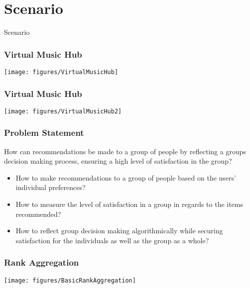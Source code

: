 \section{Scenario}

\begin{frame}
	\begin{center}
		\huge Scenario
	\end{center}
\end{frame}

\begin{frame}
	\frametitle{Virtual Music Hub}
	\texttt{[image: figures/VirtualMusicHub]}
\end{frame}

\begin{frame}
	\frametitle{Virtual Music Hub}
	\texttt{[image: figures/VirtualMusicHub2]}
\end{frame}

\begin{frame}
	\frametitle{Problem Statement}
	How can recommendations be made to a group of people by reflecting a groups decision making process, ensuring a high level of satisfaction in the group?
	\begin{itemize}
		\item How to make recommendations to a group of people based on the users' individual preferences?
		\item How to measure the level of satisfaction in a group in regards to the items recommended?
		\item How to reflect group decision making algorithmically while securing satisfaction for the individuals as well as the group as a whole?
	\end{itemize}
\end{frame}

\begin{frame}
	\frametitle{Rank Aggregation}
	\centering
	\texttt{[image: figures/BasicRankAggregation]}
\end{frame}